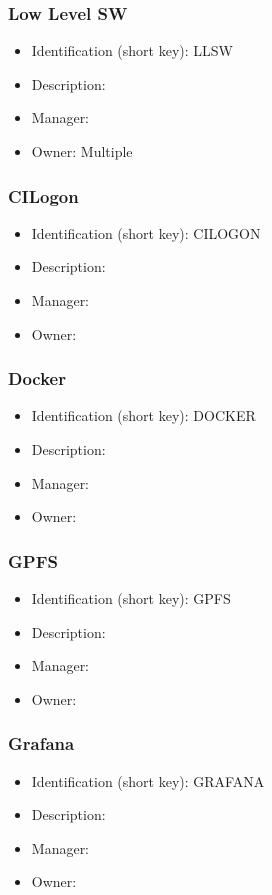 \subsubsection{Low Level SW}\label{sect:LLSW}
\begin{itemize}
\item Identification (short key): LLSW
\item Description: 
\item Manager: 
\item Owner: Multiple
\end{itemize}

\subsubsection{CILogon}\label{sect:CILOGON}
\begin{itemize}
\item Identification (short key): CILOGON
\item Description: 
\item Manager: 
\item Owner: 
\end{itemize}

\subsubsection{Docker}\label{sect:DOCKER}
\begin{itemize}
\item Identification (short key): DOCKER
\item Description: 
\item Manager: 
\item Owner: 
\end{itemize}

\subsubsection{GPFS}\label{sect:GPFS}
\begin{itemize}
\item Identification (short key): GPFS
\item Description: 
\item Manager: 
\item Owner: 
\end{itemize}

\subsubsection{Grafana}\label{sect:GRAFANA}
\begin{itemize}
\item Identification (short key): GRAFANA
\item Description: 
\item Manager: 
\item Owner: 
\end{itemize}

